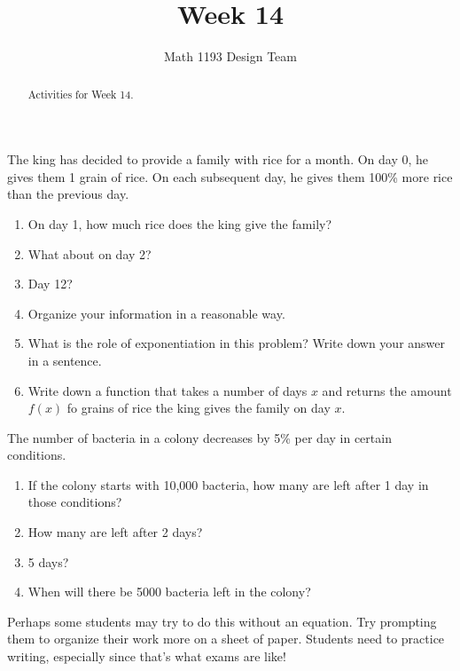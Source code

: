 \documentclass[noauthor,noinstructornotes]{ximera}
\title{Week 14}
\author{Math 1193 Design Team}
\begin{document}
\begin{abstract}
    Activities for Week 14.
\end{abstract}
\maketitle

\begin{problem}
The king has decided to provide a family with rice for a month. 
On day 0, he gives them 1 grain of rice. On each subsequent day, 
he gives them 100\% more rice than the previous day. 

\begin{enumerate}
    \item On day 1, how much rice does the king give the family?
    \item What about on day 2?
    \item Day 12?
    \item Organize your information in a reasonable way.
    \item What is the role of exponentiation in this problem? Write down
    your answer in a sentence.
    \item Write down a function that takes a number of days \(x\)
    and returns the amount \(f(x)\) fo grains of rice the king gives the
    family on day \(x\).
\end{enumerate}
\end{problem}

\begin{problem}
The number of bacteria in a colony decreases by 5\% per day in certain conditions.

\begin{enumerate}
    \item If the colony starts with 10,000 bacteria, how many are left
    after 1 day in those conditions?
    \item How many are left after 2 days?
    \item 5 days?
    \item When will there be 5000 bacteria left in the colony?
\end{enumerate}

\begin{instructorNotes}
Perhaps some students may try to do this without an equation. Try 
prompting them to organize their work more on a sheet of paper.
Students need to practice writing, especially since that's what exams 
are like!
\end{instructorNotes}
\end{problem}
\end{document}
